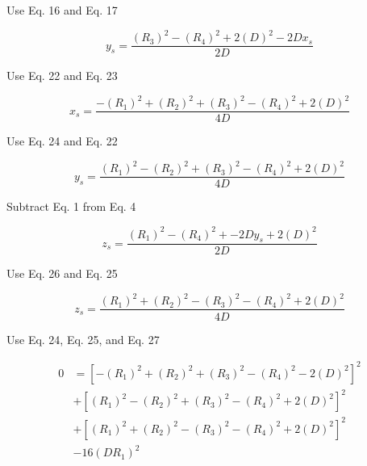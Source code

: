 \documentclass[12pt]{article}
\begin{document}
\vspace{5 mm}
\noindent Use Eq. 16 and Eq. 17
\begin{center}
\begin{equation} \label{eq:23}
y_s = \frac{(R_3)^2 - (R_4)^2 + 2(D)^2 - 2Dx_s}{2D}
\end{equation}
\end{center}

\vspace{5 mm}
\noindent Use Eq. 22 and Eq. 23 
\begin{center}
\begin{equation} \label{eq:24}
x_s = \frac{-(R_1)^2 + (R_2)^2 + (R_3)^2 - (R_4)^2 + 2(D)^2}{4D}
\end{equation}
\end{center}

\vspace{5 mm}
\noindent Use Eq. 24 and Eq. 22
\begin{center}
\begin{equation} \label{eq:25}
y_s = \frac{(R_1)^2 - (R_2)^2 + (R_3)^2 - (R_4)^2 + 2(D)^2}{4D}
\end{equation}
\end{center}

\vspace{5 mm}
\noindent Subtract Eq. 1 from Eq. 4
\begin{center}
\begin{equation} \label{eq:26}
z_s = \frac{(R_1)^2 - (R_4)^2 + -2Dy_s + 2(D)^2}{2D}
\end{equation}
\end{center}

\vspace{5 mm}
\noindent Use Eq. 26 and Eq. 25
\begin{center}
\begin{equation} \label{eq:27}
z_s = \frac{(R_1)^2 + (R_2)^2 - (R_3)^2 - (R_4)^2 + 2(D)^2}{4D}
\end{equation}
\end{center}

\pagebreak
\noindent Use Eq. 24, Eq. 25, and Eq. 27
\begin{center}
\begin{equation} \label{eq:28}
\begin{split}
0 &= [-(R_1)^2+(R_2)^2+(R_3)^2-(R_4)^2-2(D)^2]^2 \\
  &+ [ (R_1)^2-(R_2)^2+(R_3)^2-(R_4)^2+2(D)^2]^2 \\
  &+ [ (R_1)^2+(R_2)^2-(R_3)^2-(R_4)^2+2(D)^2]^2 \\
  &- 16(DR_1)^2
\end{split}
\end{equation}
\end{center}
\end{document}
